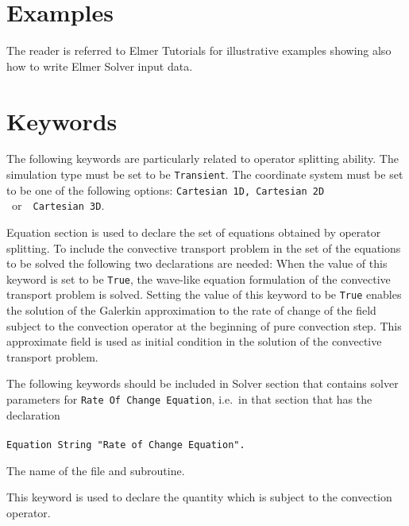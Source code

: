 \section{Examples}

The reader is referred to Elmer Tutorials for illustrative examples 
showing also how to write Elmer Solver input data.  

\section{Keywords}
The following keywords are particularly related to operator splitting 
ability.
\sifbegin
{}
\sifbegin
{} 
The simulation type must be set to be {\tt Transient}. 
The coordinate system must be set to be one of the following options:
{\tt Cartesian 1D, Cartesian 2D }\  or\ \ {\tt Cartesian 3D}.
\sifend


Equation section is used to declare the set of equations obtained by operator 
splitting. To include the convective transport problem in the set of the
equations to be solved the following two declarations are needed: 
\sifbegin
{} 
When the value of this keyword is set to be {\tt True}, the wave-like equation 
formulation of the convective transport problem is solved.    
Setting the value of this keyword to be {\tt True} enables the solution of 
the Galerkin approximation to the rate of change of the field subject 
to the convection operator at the beginning of pure convection step. This 
approximate field is used as initial condition in the solution of the 
convective transport problem. 
\sifend


The following keywords should be included in Solver section that contains
solver parameters for {\tt Rate Of Change Equation}, i.e.\ in that  
section that has the declaration \\ \\
{\tt Equation String "Rate of Change Equation".}

\sifbegin
{} 
The name of the file and subroutine.

This keyword is used to declare the quantity which is subject to the convection
operator.

